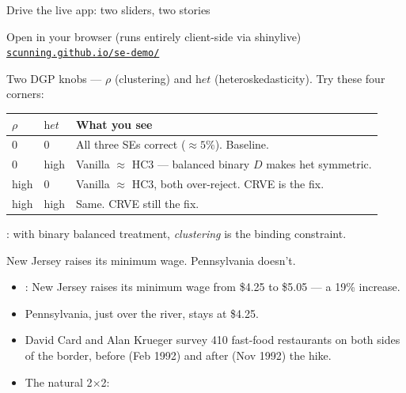 \documentclass[aspectratio=169,11pt]{beamer}
\begin{document}
\begin{frame}{Drive the live app: two sliders, two stories}
\vspace{0.3em}
\begin{block}{Open in your browser (runs entirely client-side via shinylive)}
\centering
\href{https://scunning.github.io/se-demo/}{\color{ocean}\texttt{scunning.github.io/se-demo/}}
\end{block}
\vspace{0.3em}
{\small Two DGP knobs --- $\rho$ (clustering) and $\textit{het}$ (heteroskedasticity). Try these four corners:}
\vspace{0.2em}
\begin{center}
\renewcommand{\arraystretch}{1.3}
\footnotesize
\begin{tabular}{@{}l l l@{}}
\toprule
\textbf{$\rho$} & \textbf{$\textit{het}$} & \textbf{What you see} \\
\midrule
$0$ & $0$ & All three SEs correct ($\approx 5\%$). Baseline. \\
$0$ & high & Vanilla $\approx$ HC3 --- balanced binary $D$ makes het symmetric. \\
high & $0$ & Vanilla $\approx$ HC3, both over-reject. CRVE is the fix. \\
high & high & Same. CRVE still the fix. \\
\bottomrule
\end{tabular}
\end{center}
\vspace{0.2em}
: with binary balanced treatment, \textit{clustering} is the binding constraint.
\end{frame}


\begin{frame}{New Jersey raises its minimum wage. Pennsylvania doesn't.}
\vspace{0.4em}
\begin{itemize}
  \item {}: New Jersey raises its minimum wage from \$4.25 to \$5.05 --- a 19\% increase.
  \item Pennsylvania, just over the river, stays at \$4.25.
  \item David Card and Alan Krueger survey 410 fast-food restaurants on both sides of the border, before (Feb 1992) and after (Nov 1992) the hike.
  \item The natural 2$\times$2: 
\end{itemize}
\vspace{0.4em}
\end{frame}
\end{document}
